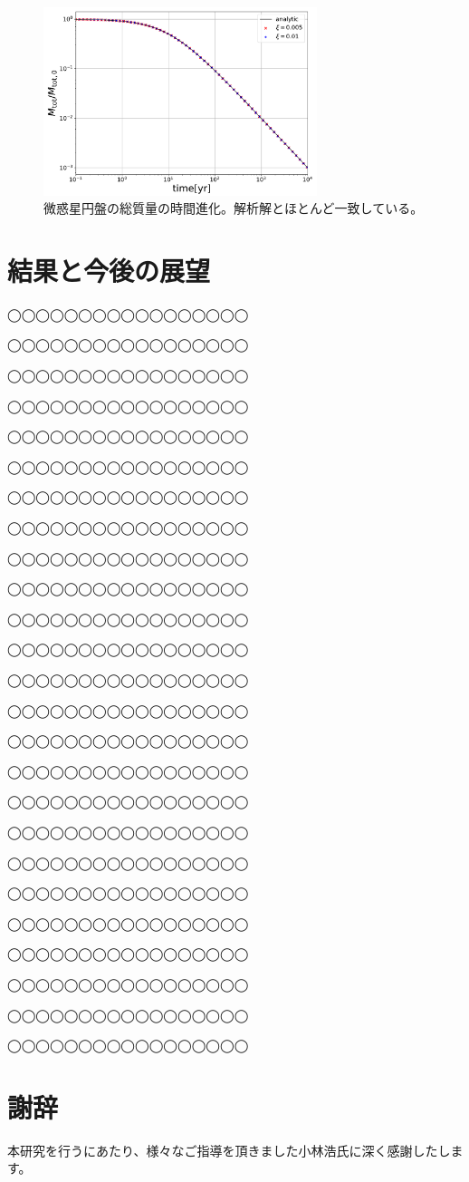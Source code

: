 \documentclass[a4paper,10pt,oneside,twocolumn,notitlepage,final]{jarticle}
\begin{document}
\begin{figure}[h]
 \centering
 \includegraphics[width=8cm]{MassDepletion.pdf}
 \caption{微惑星円盤の総質量の時間進化。解析解とほとんど一致している。\label{fig:Frag}}
\end{figure}

\section{結果と今後の展望}
◯◯◯◯◯◯◯◯◯◯◯◯◯◯◯◯◯

◯◯◯◯◯◯◯◯◯◯◯◯◯◯◯◯◯

◯◯◯◯◯◯◯◯◯◯◯◯◯◯◯◯◯

◯◯◯◯◯◯◯◯◯◯◯◯◯◯◯◯◯

◯◯◯◯◯◯◯◯◯◯◯◯◯◯◯◯◯

◯◯◯◯◯◯◯◯◯◯◯◯◯◯◯◯◯

◯◯◯◯◯◯◯◯◯◯◯◯◯◯◯◯◯

◯◯◯◯◯◯◯◯◯◯◯◯◯◯◯◯◯

◯◯◯◯◯◯◯◯◯◯◯◯◯◯◯◯◯

◯◯◯◯◯◯◯◯◯◯◯◯◯◯◯◯◯

◯◯◯◯◯◯◯◯◯◯◯◯◯◯◯◯◯

◯◯◯◯◯◯◯◯◯◯◯◯◯◯◯◯◯

◯◯◯◯◯◯◯◯◯◯◯◯◯◯◯◯◯

◯◯◯◯◯◯◯◯◯◯◯◯◯◯◯◯◯

◯◯◯◯◯◯◯◯◯◯◯◯◯◯◯◯◯

◯◯◯◯◯◯◯◯◯◯◯◯◯◯◯◯◯

◯◯◯◯◯◯◯◯◯◯◯◯◯◯◯◯◯

◯◯◯◯◯◯◯◯◯◯◯◯◯◯◯◯◯

◯◯◯◯◯◯◯◯◯◯◯◯◯◯◯◯◯

◯◯◯◯◯◯◯◯◯◯◯◯◯◯◯◯◯

◯◯◯◯◯◯◯◯◯◯◯◯◯◯◯◯◯

◯◯◯◯◯◯◯◯◯◯◯◯◯◯◯◯◯

◯◯◯◯◯◯◯◯◯◯◯◯◯◯◯◯◯

◯◯◯◯◯◯◯◯◯◯◯◯◯◯◯◯◯

◯◯◯◯◯◯◯◯◯◯◯◯◯◯◯◯◯


\section*{謝辞}
本研究を行うにあたり、様々なご指導を頂きました小林浩氏に深く感謝したします。
\end{document}
